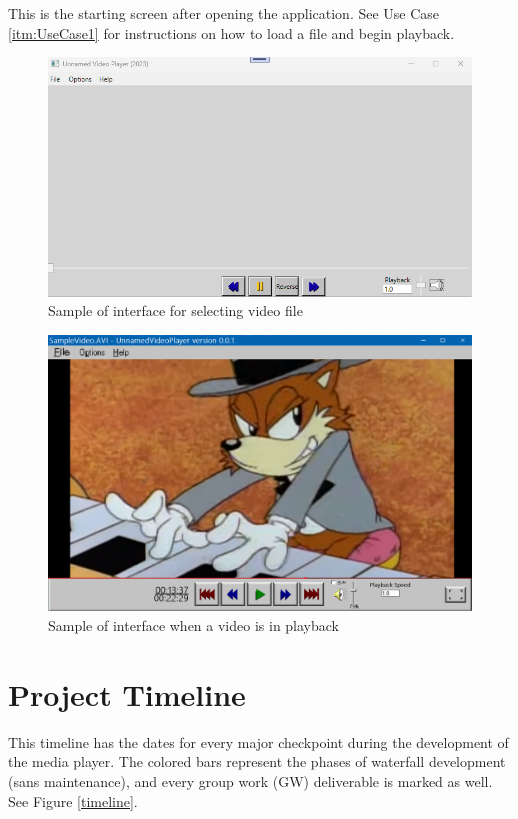 \documentclass[10pt,conference,onecolumn,compsoc]{IEEEtran}
\begin{document}
This is the starting screen after opening the application. See Use Case \ref{itm:UseCase1} for instructions on how to load a file and begin playback.
\begin{figure}[H]
\begin{center}
\includegraphics[scale=.8]{PlayerInterface.png}
\caption{Sample of interface for selecting video file}
\label{PlayerInterface}
\end{center}
\end{figure}

\begin{figure}[H]
\begin{center}
\includegraphics[scale=.7]{PlayerMockup.png}
\caption{Sample of interface when a video is in playback}
\label{PlayerMockup}
\end{center}
\end{figure}

\clearpage
\section{Project Timeline}
This timeline has the dates for every major checkpoint during the development of the media player. The colored bars represent the phases of waterfall development (sans maintenance), and every group work (GW) deliverable is marked as well.
See Figure \ref{timeline}.
\end{document}
